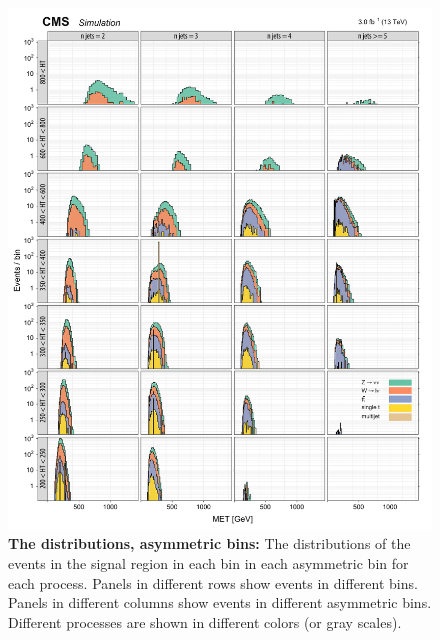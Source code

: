 \begin{figure}[!h]
\centering
\includegraphics[scale=0.95]{figures/kiplots/c150107_s150318_f015_MET_40}
\caption{\textbf{\boldmath The \met distributions, asymmetric \njet
bins:} The \met distributions of the events in the signal region in each
\scalht bin in each asymmetric \njet bin for each process. Panels in
different rows show events in different \scalht bins. Panels in
different columns show events in different asymmetric \njet bins.
Different processes are shown in different colors (or gray scales).}
\label{c150107_s150318_f015_MET_40}
\end{figure}

